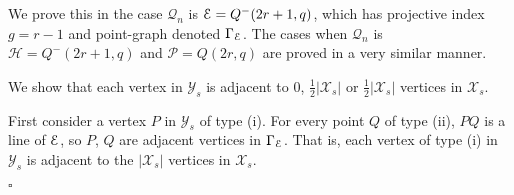 \documentclass[12pt]{article}
\newenvironment{proof}{\noindent{\bf Proof}\hspace{0.5em}}
    { \null  \hfill $\square$ \par}
\newcommand{\X}{\mathcal X}
\newcommand{\Y}{\mathcal Y}
\newcommand\E{{\cal E}}
\renewcommand{\P}{\mathcal P}
\renewcommand{\H}{\mathcal H}
\newcommand{\Q}{\mathscr Q}
\newcommand\TODO[1]{{\color{Purple} #1}}
\begin{document}
\begin{proof}%
We prove this in the case $\Q_n$ is $\E=Q^-(2r+1,q)$, which has projective index $g=r-1$ and point-graph denoted $\Gamma_\E$. The cases when $\Q_n$ is $\H=Q^-(2r+1,q)$ and $\P=Q(2r,q)$ are proved in a very similar manner. 

\TODO{We show that each vertex in $\Y_s$ is adjacent to $0$, $\frac12|\X_s|$ or $\frac12|\X_s|$ vertices in $\X_s$.

First consider a vertex $P$ in $\Y_s$ of type (i). For every point $Q$ of type (ii), $PQ$ is a line of $\E$, so $P$, $Q$ are adjacent vertices in $\Gamma_\E$. That is, each vertex of type (i) in $\Y_s$ is adjacent to the $|\X_s|$ vertices in $\X_s$.

}
\end{proof}
\end{document}
